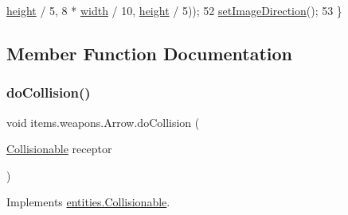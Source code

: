 \begin{DoxyCode}
      \mbox{\hyperlink{classorg_1_1newdawn_1_1slick_1_1geom_1_1_rectangle_a3bd010fdce636fc11ed0e0ad4d4b4a0a}{height}} / 5, 8 * \mbox{\hyperlink{classorg_1_1newdawn_1_1slick_1_1geom_1_1_rectangle_a967e1823f62daf45abb142779d1be62d}{width}} / 10, \mbox{\hyperlink{classorg_1_1newdawn_1_1slick_1_1geom_1_1_rectangle_a3bd010fdce636fc11ed0e0ad4d4b4a0a}{height}} / 5));
52         \mbox{\hyperlink{classitems_1_1weapons_1_1_arrow_a0382492d0b384efe35b57bd18d9cf20c}{setImageDirection}}();
53     \}
\end{DoxyCode}


\subsection{Member Function Documentation}
\mbox{\label{classitems_1_1weapons_1_1_arrow_aab7e6b254eafcc351c445269351900c0}} 
\subsubsection{\texorpdfstring{do\+Collision()}{doCollision()}}
{\footnotesize\ttfamily void items.\+weapons.\+Arrow.\+do\+Collision (\begin{DoxyParamCaption}\item[{\mbox{\hyperlink{interfaceentities_1_1_collisionable}{Collisionable}}}]{receptor }\end{DoxyParamCaption})\hspace{0.3cm}{\ttfamily [inline]}}



Implements \mbox{\hyperlink{interfaceentities_1_1_collisionable_aaebba0fda34be003cfe326471e1418c8}{entities.\+Collisionable}}.


